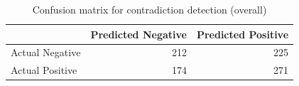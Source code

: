 \begin{table}
\caption{Confusion matrix for contradiction detection (overall)}
\label{tab:confusion_matrix}
\begin{tabular}{lrr}
\toprule
 & Predicted Negative & Predicted Positive \\
\midrule
Actual Negative & 212 & 225 \\
Actual Positive & 174 & 271 \\
\bottomrule
\end{tabular}
\end{table}
